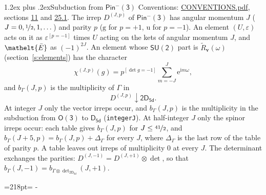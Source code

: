 \documentclass[10pt,a4paper]{article}
\makeatletter
\renewcommand\section{\@startsection{section}{1}{\z@}{-3ex plus -1ex minus -.2ex}%
  {1.2ex plus .2ex}{\normalfont\large\sffamily\bfseries\color{parttitle}}}
\newcommand{\needspace}[1]{\par\penalty-100\begingroup\dimen0=#1\relax\dimen2=\pagegoal
  \advance\dimen2-\pagetotal\ifdim\dimen0>\dimen2\relax\ifdim\dimen2>0pt\vfil\break\fi\fi
  \endgroup}
\numberwithin{equation}{section}
\newcommand{\eltfont}[1]{{\let\sigma\eltsigma\mathelt{#1}}}
\newcommand{\grp}[1]{\mathsf{#1}}
\newcommand{\elt}[1]{\eltfont{#1}}
\newcommand{\ptag}[1]{\mathrm{#1}}
\newcommand{\iverson}[1]{[#1]}
\newcommand{\restr}[2]{#1\!\downarrow#2}
\newcommand{\vv}{\mathbf{v}}
\newcommand{\iunit}{\mathrm{i}}
\newcommand{\expe}{\mathrm{e}}
\newcommand{\irrJp}[2]{D^{(#1,#2)}}
\newcommand{\irrprod}{\otimes}
\newcommand{\barred}[1]{\bar{#1}}
\newcommand{\lift}[1]{\tilde{#1}}
\makeatother
\begin{document}
\section{Subduction from \texorpdfstring{$\grp{Pin^{-}(3)}$}{Pin(3)}}\label{s:subduction_parent}
Conventions: \href{../../CONVENTIONS.pdf}{CONVENTIONS.pdf}, sections \href{../../../rotation/CONVENTIONS.pdf\#conv.11}{11} and \href{../../CONVENTIONS.pdf\#conv.25.1}{25.1}.
\leavevmode\label{n:index.J}\label{n:index.parity}\label{n:irrep.o3}The irrep $\irrJp{J}{p}$ of \href{Pinminus3.pdf}{$\grp{Pin^{-}(3)}$} has angular momentum $J$ ($J = 0, \nicefrac{1}{2}, 1, \dots$) and parity $p$ ($\ptag{g}$ for $p = +1$, $\ptag{u}$ for $p = -1$). An element $(U, \varepsilon)$ acts on it as $\varepsilon^{[p = -1]}$ times $U$ acting on the kets of angular momentum $J$, and $\elt{\barred{E}}$ as $(-1)^{2J}$. \label{n:function.character.parent}\label{n:function.multiplicity}An element whose $\grp{SU(2)}$ part is $\lift{R}_{\vv}(\omega)$ (section~\ref{s:elements}) has the character
\begin{equation}\label{e:chi}\chi^{(J,p)}(g) = p^{\iverson{\det g = -1}}\sum_{m=-J}^{J} \expe^{\iunit m\omega},\end{equation}
and $b_\Gamma(J, p)$ is the multiplicity of $\Gamma$ in
\begin{equation}\label{e:parent}\restr{\irrJp{J}{p}}{\grp{2D_{5d}}}.\end{equation}
At integer $J$ only the vector irreps occur, and $b_\Gamma(J, p)$ is the multiplicity in the subduction from $\grp{O(3)}$ to \href{../../../rotation/data/pdf/D5d.pdf}{$\grp{D_{5d}}$} (\texttt{integerJ}). \label{n:index.increment}At half-integer $J$ only the spinor irreps occur: each table gives $b_\Gamma(J, p)$ for $J \le \nicefrac{41}{2}$, and $b_\Gamma(J + 5, p) = b_\Gamma(J, p) + \Delta_\Gamma$ for every $J$, where $\Delta_\Gamma$ is the last row of the table of parity $p$. A table leaves out irreps of multiplicity 0 at every $J$.
\leavevmode\label{n:operator.determinant.character}The determinant exchanges the parities: $\irrJp{J}{-1} = \irrJp{J}{+1} \irrprod \det$, so that $b_\Gamma(J, -1) = b_{\Gamma \irrprod \det_{\grp{2D_{5d}}}}(J, +1)$.
\needspace{218pt}
\end{document}

